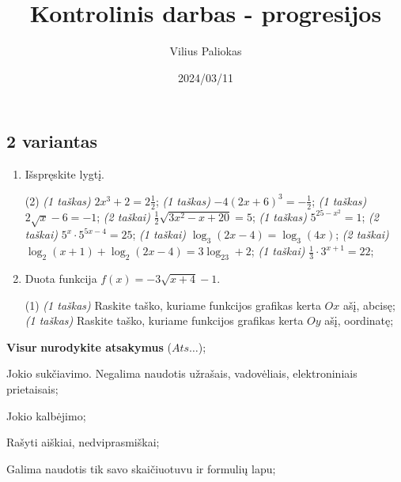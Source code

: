 \documentclass[a4paper]{article}
\title{Kontrolinis darbas - progresijos}
\author{Vilius Paliokas}
\date{2024/03/11}
\begin{document}
\thispagestyle{fancy}

\titlespacing*{\subsection}{0pt}{.75ex}{0.75ex}

\subsection*{2 variantas}

\begin{enumerate}
      \item Išspręskite lygtį.
            \begin{tasks}[item-format={\normalfont}, after-item-skip=2mm](2)
                  \task \textit{(1 taškas)} $2x^3+2=2\frac{1}{2}$;
                  \task \textit{(1 taškas)} $-4(2x+6)^3=-\frac{1}{2}$;
                  \task \textit{(1 taškas)} $2\sqrt{x}-6=-1$;
                  \task \textit{(2 taškai)} $\frac{1}{2}\sqrt{3x^2-x+20}=5$;
                  \task \textit{(1 taškas)} $5^{25-x^2}=1$;
                  \task \textit{(2 taškai)} $5^x\cdot5^{5x-4}=25$;
                  \task \textit{(1 taškai)} $\log_3(2x-4)=\log_3(4x)$;
                  \task \textit{(2 taškai)} $\log _2\left(x+1\right)+\log _2\left(2x-4\right)=3\log _23+2$;
                  \task \textit{(1 taškai)} $\frac{1}{3}\cdot 3^{x+1}=22$;
            \end{tasks}

      \item Duota funkcija $f(x)=-3\sqrt{x+4}-1$.
            \begin{tasks}[item-format={\normalfont}, after-item-skip=2mm](1)
                  \task \textit{(1 taškas)} Raskite taško, kuriame funkcijos grafikas kerta $Ox$ ašį, abcisę;
                  \task \textit{(1 taškas)} Raskite taško, kuriame funkcijos grafikas kerta $Oy$ ašį, oordinatę;
            \end{tasks}
\end{enumerate}

\begin{small}
      \begin{enumerate*}[label={(\arabic*)}]
            \item \textbf{Visur} \textbf{nurodykite atsakymus} ($Ats\ldots$);
            \item Jokio sukčiavimo. Negalima naudotis užrašais, vadovėliais,
            elektroniniais prietaisais;
            \item Jokio kalbėjimo;
            \item Rašyti aiškiai, nedviprasmiškai;
            \item Galima naudotis tik savo skaičiuotuvu ir formulių lapu;
      \end{enumerate*}
\end{small}
\end{document}
